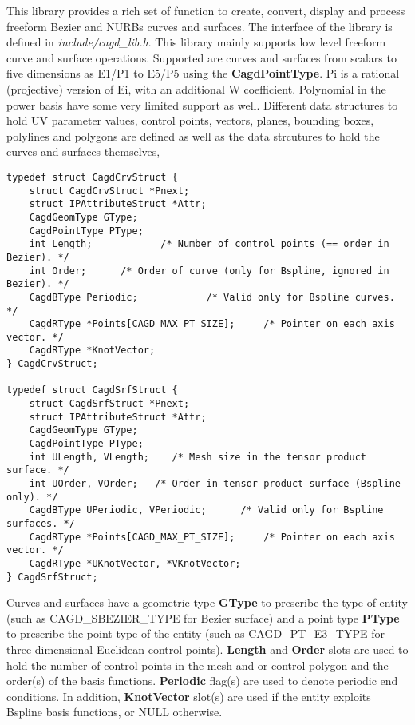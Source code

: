 This library provides a rich set of function to create, convert,
display and process freeform Bezier and NURBs curves and surfaces. The
interface of the library is defined in {\em include/cagd\_lib.h}. This
library mainly supports low level freeform curve and surface
operations.  Supported are curves and surfaces from scalars to five
dimensions as E1/P1 to E5/P5 using the {\bf CagdPointType}. Pi is a
rational (projective) version of Ei, with an additional W coefficient.
Polynomial in the power basis have some very limited support as well.
Different data structures to hold UV parameter values, control points,
vectors, planes, bounding boxes, polylines and polygons are defined as
well as the data strcutures to hold the curves and surfaces
themselves,
\begin{verbatim}
typedef struct CagdCrvStruct {
    struct CagdCrvStruct *Pnext;
    struct IPAttributeStruct *Attr;
    CagdGeomType GType;
    CagdPointType PType;
    int Length;            /* Number of control points (== order in Bezier). */
    int Order;	    /* Order of curve (only for Bspline, ignored in Bezier). */
    CagdBType Periodic;			   /* Valid only for Bspline curves. */
    CagdRType *Points[CAGD_MAX_PT_SIZE];     /* Pointer on each axis vector. */
    CagdRType *KnotVector;
} CagdCrvStruct;

typedef struct CagdSrfStruct {
    struct CagdSrfStruct *Pnext;
    struct IPAttributeStruct *Attr;
    CagdGeomType GType;
    CagdPointType PType;
    int ULength, VLength;	 /* Mesh size in the tensor product surface. */
    int UOrder, VOrder;   /* Order in tensor product surface (Bspline only). */
    CagdBType UPeriodic, VPeriodic;      /* Valid only for Bspline surfaces. */
    CagdRType *Points[CAGD_MAX_PT_SIZE];     /* Pointer on each axis vector. */
    CagdRType *UKnotVector, *VKnotVector;
} CagdSrfStruct;
\end{verbatim}

Curves and surfaces have a geometric type {\bf GType} to prescribe the
type of entity (such as CAGD\_SBEZIER\_TYPE for Bezier surface) and a
point type {\bf PType} to prescribe the point type of the entity (such
as CAGD\_PT\_E3\_TYPE for three dimensional Euclidean control points).
{\bf Length} and {\bf Order} slots are used to hold the number of
control points in the mesh and or control polygon and the order(s) of
the basis functions. {\bf Periodic} flag(s) are used to denote
periodic end conditions. In addition, {\bf KnotVector} slot(s) are
used if the entity exploits Bspline basis functions, or NULL
otherwise.

